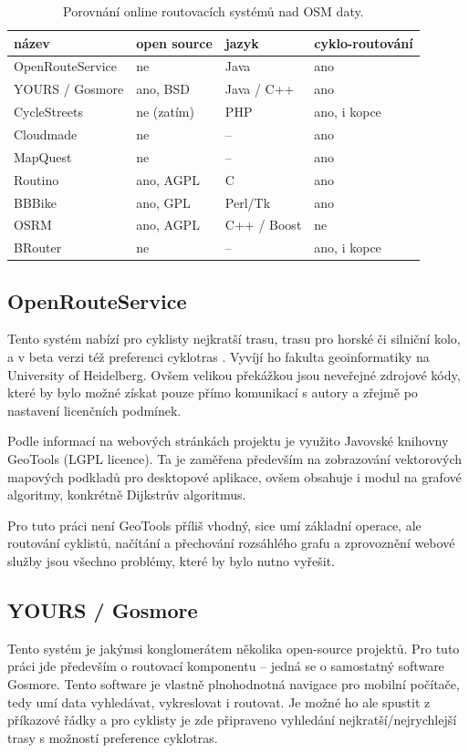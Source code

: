 \documentclass[thesis=B,czech]{FITthesis}[2012/06/26]
\begin{document}
\begin{table}[h!]
\begin{tabular}{l|l|l|l} %
\textbf{název} & \textbf{open source} & \textbf{jazyk} & \textbf{cyklo-routování}  \\
\hline
OpenRouteService   & ne   & Java   & ano    \\
YOURS / Gosmore    & ano, BSD & Java / C++ & ano \\
CycleStreets       & ne (zatím) & PHP & ano, i kopce \\
Cloudmade & ne & -- & ano \\
MapQuest & ne &  -- & ano \\
Routino  &  ano, AGPL &  C & ano \\
BBBike & ano, GPL& Perl/Tk& ano \\
OSRM  &  ano, AGPL & C++ / Boost & ne \\
BRouter & ne & -- & ano, i kopce
\end{tabular}
\caption{Porovnání online routovacích systémů nad OSM daty.}
\label{table:srovnani}
\end{table}



\subsection{OpenRouteService}
Tento systém nabízí pro cyklisty nejkratší trasu, trasu pro horské či silniční kolo,  a v beta verzi též preferenci cyklotras \cite{openrouteservice}. Vyvíjí ho fakulta geoinformatiky na University of Heidelberg. Ovšem velikou překážkou jsou neveřejné zdrojové kódy, které by bylo možné získat pouze přímo komunikací s autory a zřejmě po nastavení licenčních podmínek.

Podle informací na webových stránkách projektu je využito Javovské knihovny GeoTools (LGPL licence). Ta je zaměřena především na zobrazování vektorových mapových podkladů pro desktopové aplikace, ovšem obsahuje i modul na grafové algoritmy, konkrétně Dijkstrův algoritmus. 

Pro tuto práci není GeoTools příliš vhodný, sice umí základní operace, ale routování cyklistů, načítání a přechování rozsáhlého grafu a zprovoznění webové služby jsou všechno problémy, které by bylo nutno vyřešit.


\subsection{YOURS / Gosmore}
Tento systém \cite{yours} je jakýmsi konglomerátem několika open-source projektů. Pro tuto práci jde především o routovací komponentu -- jedná se o samostatný software Gosmore. Tento software je vlastně plnohodnotná navigace pro mobilní počítače, tedy umí data vyhledávat, vykreslovat i routovat. Je možné ho ale spustit z příkazové řádky a pro cyklisty je zde připraveno vyhledání nejkratší/nejrychlejší trasy s možností preference cyklotras. 
\end{document}
